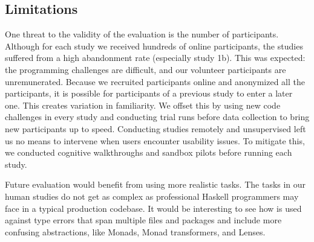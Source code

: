 \subsection{Limitations}

One threat to the validity of the evaluation is the number of participants. Although for each study we received hundreds of online participants, the studies suffered from a high abandonment rate (especially study 1b). This was expected: the programming challenges are difficult, and our volunteer participants are unremunerated. 
Because we recruited participants online and anonymized all the participants, it is possible for participants of a previous study to enter a later one. This creates variation in familiarity. We offset this by using new code challenges in every study and conducting trial runs before data collection to bring new participants up to speed.
Conducting studies remotely and unsupervised left us no means to intervene when users encounter usability issues. To mitigate this, we conducted cognitive walkthroughs and sandbox pilots before running each study.

Future evaluation would benefit from using more realistic tasks. The tasks in our human studies do not get as complex as professional Haskell programmers may face in a typical production codebase. It would be interesting to see how \chameleon{} is used against type errors that span multiple files and packages and include more confusing abstractions, like Monads, Monad transformers, and Lenses.
